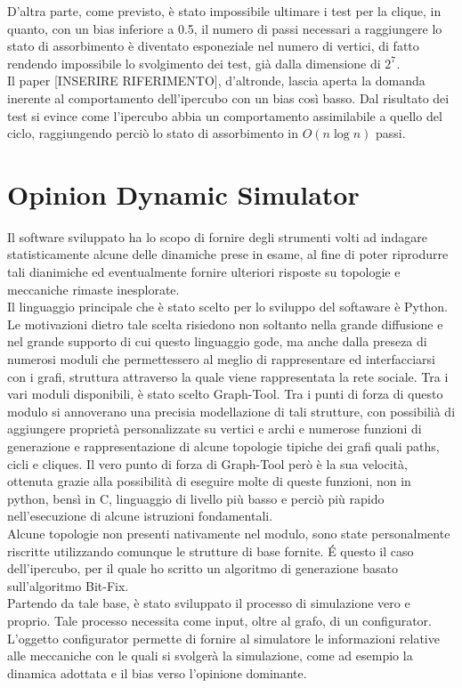 \documentclass{article}
\begin{document}
D'altra parte, come previsto, è stato impossibile ultimare i test per la clique, in quanto, con un bias inferiore a 0.5, il numero di passi necessari a raggiungere lo stato di assorbimento è diventato esponeziale nel numero di vertici, di fatto rendendo impossibile lo svolgimento dei test, già dalla dimensione di $2^{7^{\mathrm{}}}$.\\
Il paper [INSERIRE RIFERIMENTO], d'altronde, lascia aperta la domanda inerente al comportamento dell'ipercubo con un bias così basso. Dal risultato dei test si evince come l'ipercubo abbia un comportamento assimilabile a quello del ciclo, raggiungendo perciò lo stato di assorbimento in $O(n\log{}n)$ passi. 

\section{Opinion Dynamic Simulator}
Il software sviluppato ha lo scopo di fornire degli strumenti volti ad indagare statisticamente alcune delle dinamiche prese in esame, al fine di poter riprodurre tali dianimiche ed eventualmente fornire ulteriori risposte su topologie e meccaniche rimaste inesplorate.\\
Il linguaggio principale che è stato scelto per lo sviluppo del softaware è Python. Le motivazioni dietro tale scelta risiedono non soltanto nella grande diffusione e nel grande supporto di cui questo linguaggio gode, ma anche dalla preseza di numerosi moduli che permettessero al meglio di rappresentare ed interfacciarsi con i grafi, struttura attraverso la quale viene rappresentata la rete sociale.
Tra i vari moduli disponibili, è stato scelto Graph-Tool. Tra i punti di forza di questo modulo si annoverano una precisia modellazione di tali strutture, con possibilià di aggiungere proprietà personalizzate su vertici e archi e numerose funzioni di generazione e rappresentazione di alcune topologie tipiche dei grafi quali paths, cicli e cliques. Il vero punto di forza di Graph-Tool però è la sua velocità, ottenuta grazie alla possibilità di eseguire molte di queste funzioni, non in python, bensì in C, linguaggio di livello più basso e perciò più rapido nell'esecuzione di alcune istruzioni fondamentali.\\
Alcune topologie non presenti nativamente nel modulo, sono state personalmente riscritte utilizzando comunque le strutture di base fornite. É questo il caso dell'ipercubo, per il quale ho scritto un algoritmo di generazione basato sull'algoritmo Bit-Fix.\\
Partendo da tale base, è stato sviluppato il processo di simulazione vero e proprio. Tale processo necessita come input, oltre al grafo, di un configurator. L'oggetto configurator permette di fornire al simulatore le informazioni relative alle meccaniche con le quali si svolgerà la simulazione, come ad esempio la dinamica adottata e il bias verso l'opinione dominante.\\ 
\end{document}
